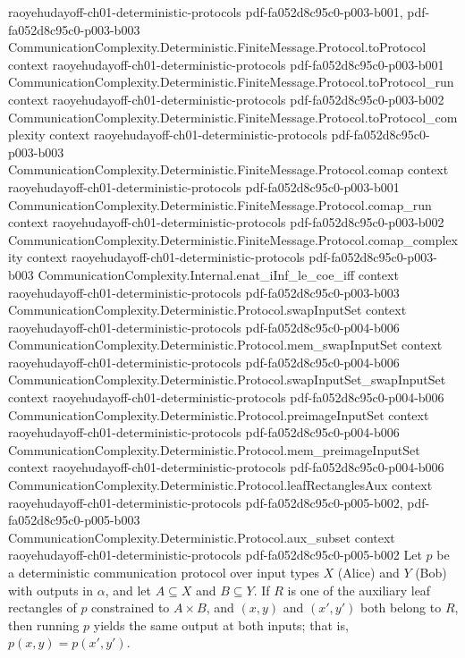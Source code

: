 \begin{lemma}
  {raoyehudayoff-ch01-deterministic-protocols}
  {pdf-fa052d8c95c0-p003-b001,
    pdf-fa052d8c95c0-p003-b003}
\proofstep
  {CommunicationComplexity.Deterministic.FiniteMessage.Protocol.toProtocol}
  {context}
  {raoyehudayoff-ch01-deterministic-protocols}
  {pdf-fa052d8c95c0-p003-b001}
\proofstep
  {CommunicationComplexity.Deterministic.FiniteMessage.Protocol.toProtocol_run}
  {context}
  {raoyehudayoff-ch01-deterministic-protocols}
  {pdf-fa052d8c95c0-p003-b002}
\proofstep
  {CommunicationComplexity.Deterministic.FiniteMessage.Protocol.toProtocol_complexity}
  {context}
  {raoyehudayoff-ch01-deterministic-protocols}
  {pdf-fa052d8c95c0-p003-b003}
\proofstep
  {CommunicationComplexity.Deterministic.FiniteMessage.Protocol.comap}
  {context}
  {raoyehudayoff-ch01-deterministic-protocols}
  {pdf-fa052d8c95c0-p003-b001}
\proofstep
  {CommunicationComplexity.Deterministic.FiniteMessage.Protocol.comap_run}
  {context}
  {raoyehudayoff-ch01-deterministic-protocols}
  {pdf-fa052d8c95c0-p003-b002}
\proofstep
  {CommunicationComplexity.Deterministic.FiniteMessage.Protocol.comap_complexity}
  {context}
  {raoyehudayoff-ch01-deterministic-protocols}
  {pdf-fa052d8c95c0-p003-b003}
\proofstep
  {CommunicationComplexity.Internal.enat_iInf_le_coe_iff}
  {context}
  {raoyehudayoff-ch01-deterministic-protocols}
  {pdf-fa052d8c95c0-p003-b003}
\proofstep
  {CommunicationComplexity.Deterministic.Protocol.swapInputSet}
  {context}
  {raoyehudayoff-ch01-deterministic-protocols}
  {pdf-fa052d8c95c0-p004-b006}
\proofstep
  {CommunicationComplexity.Deterministic.Protocol.mem_swapInputSet}
  {context}
  {raoyehudayoff-ch01-deterministic-protocols}
  {pdf-fa052d8c95c0-p004-b006}
\proofstep
  {CommunicationComplexity.Deterministic.Protocol.swapInputSet_swapInputSet}
  {context}
  {raoyehudayoff-ch01-deterministic-protocols}
  {pdf-fa052d8c95c0-p004-b006}
\proofstep
  {CommunicationComplexity.Deterministic.Protocol.preimageInputSet}
  {context}
  {raoyehudayoff-ch01-deterministic-protocols}
  {pdf-fa052d8c95c0-p004-b006}
\proofstep
  {CommunicationComplexity.Deterministic.Protocol.mem_preimageInputSet}
  {context}
  {raoyehudayoff-ch01-deterministic-protocols}
  {pdf-fa052d8c95c0-p004-b006}
\proofstep
  {CommunicationComplexity.Deterministic.Protocol.leafRectanglesAux}
  {context}
  {raoyehudayoff-ch01-deterministic-protocols}
  {pdf-fa052d8c95c0-p005-b002,
    pdf-fa052d8c95c0-p005-b003}
\proofstep
  {CommunicationComplexity.Deterministic.Protocol.aux_subset}
  {context}
  {raoyehudayoff-ch01-deterministic-protocols}
  {pdf-fa052d8c95c0-p005-b002}
Let $p$ be a deterministic communication protocol over input types $X$ (Alice) and $Y$
(Bob) with outputs in $\alpha$, and let $A \subseteq X$ and $B \subseteq Y$. If $R$ is
one of the auxiliary leaf rectangles of $p$ constrained to $A \times B$, and $(x, y)$
and $(x', y')$ both belong to $R$, then running $p$ yields the same output at both
inputs; that is, $p(x, y) = p(x', y')$.
\end{lemma}

